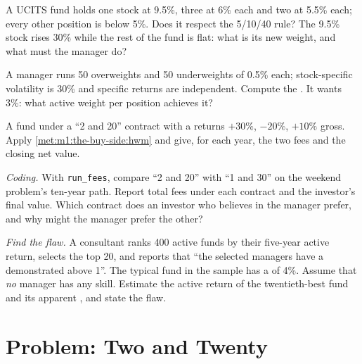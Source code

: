 \begin{exercise}[$\star\star$]\label{exo:m1:the-buy-side:4}
A UCITS fund holds one stock at 9.5\%, three at 6\% each and two at 5.5\%
each; every other position is below 5\%. Does it respect the 5/10/40 rule?
The 9.5\% stock rises 30\% while the rest of the fund is flat: what is its
new weight, and what must the manager do?
\end{exercise}

\begin{exercise}[$\star\star$]\label{exo:m1:the-buy-side:5}
A manager runs 50 overweights and 50 underweights of 0.5\% each;
stock-specific volatility is 30\% and specific returns are independent.
Compute the . It wants 3\%: what active weight per position
achieves it?
\end{exercise}

\begin{exercise}[$\star\star$]\label{exo:m1:the-buy-side:6}
A fund under a ``2 and 20'' contract with a  returns
$+30\%$, $-20\%$, $+10\%$ gross. Apply \cref{met:m1:the-buy-side:hwm} and
give, for each year, the two fees and the closing net value.
\end{exercise}

\begin{exercise}[$\star\star\star$]\label{exo:m1:the-buy-side:7}
\emph{Coding.} With \texttt{run\_fees}, compare ``2 and 20'' with ``1 and
30'' on the weekend problem's ten-year path. Report total fees under each
contract and the investor's final value. Which contract does an investor who
believes in the manager prefer, and why might the manager prefer the other?
\end{exercise}

\begin{exercise}[$\star\star\star$]\label{exo:m1:the-buy-side:8}
\emph{Find the flaw.} A consultant ranks 400 active funds by their five-year
active return, selects the top 20, and reports that ``the selected managers
have a demonstrated  above 1''. The typical fund in the
sample has a  of 4\%. Assume that \emph{no} manager has any
skill. Estimate the active return of the twentieth-best fund and its
apparent , and state the flaw.
\end{exercise}

\section{Problem: Two and Twenty}

